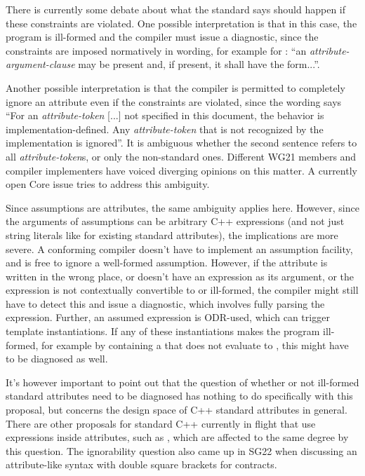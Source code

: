 There is currently some debate about what the standard says should happen if these constraints are violated. One possible interpretation is that in this case, the program is ill-formed and the compiler must issue a diagnostic, since the constraints are imposed normatively in wording, for example for \tcode{[[deprecated]]}: ``an \emph{attribute-argument-clause} may be present and, if present, it shall have the form...''.

Another possible interpretation is that the compiler is permitted to completely ignore an attribute even if the constraints are violated, since the wording says ``For an \emph{attribute-token} [...] not specified in this document, the behavior is implementation-defined. Any \emph{attribute-token} that is not recognized by the implementation is ignored''. It is ambiguous whether the second sentence refers to all \emph{attribute-token}s, or only the non-standard ones. Different WG21 members and compiler implementers have voiced diverging opinions on this matter. A currently open Core issue \cite{CWG2538} tries to address this ambiguity.

Since assumptions are attributes, the same ambiguity applies here. However, since the arguments of assumptions can be arbitrary C++ expressions (and not just string literals like for existing standard attributes), the implications are more severe. A conforming compiler doesn't have to implement an assumption facility, and is free to ignore a well-formed assumption. However, if the  attribute is written in the wrong place, or doesn't have an expression as its argument, or the expression is not contextually convertible to  or ill-formed, the compiler might still have to detect this and issue a diagnostic, which involves fully parsing the expression. Further, an assumed expression is ODR-used, which can trigger template instantiations. If any of these instantiations makes the program ill-formed, for example by containing a  that does not evaluate to , this might have to be diagnosed as well.

It's however important to point out that the question of whether or not ill-formed standard attributes need to be diagnosed has nothing to do specifically with this proposal, but concerns the design space of C++ standard attributes in general. There are other proposals for standard C++ currently in flight that use expressions inside attributes, such as  \cite{P1144R5}, which are affected to the same degree by this question. The ignorability question also came up in SG22 when discussing an attribute-like syntax with double square brackets for contracts.

